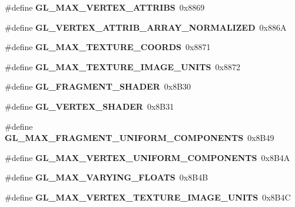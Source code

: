 \begin{DoxyCompactItemize}
\item 
\#define {\bfseries G\+L\+\_\+\+M\+A\+X\+\_\+\+V\+E\+R\+T\+E\+X\+\_\+\+A\+T\+T\+R\+I\+B\+S}~0x8869\label{_s_d_l__opengl_8h_a676ebaa9cbb5d801e916cc8f0c245f44}

\item 
\#define {\bfseries G\+L\+\_\+\+V\+E\+R\+T\+E\+X\+\_\+\+A\+T\+T\+R\+I\+B\+\_\+\+A\+R\+R\+A\+Y\+\_\+\+N\+O\+R\+M\+A\+L\+I\+Z\+E\+D}~0x886\+A\label{_s_d_l__opengl_8h_a27329f794ceb87696a167be875ce7fc8}

\item 
\#define {\bfseries G\+L\+\_\+\+M\+A\+X\+\_\+\+T\+E\+X\+T\+U\+R\+E\+\_\+\+C\+O\+O\+R\+D\+S}~0x8871\label{_s_d_l__opengl_8h_a947620859e913f928cd74a082ad9ed29}

\item 
\#define {\bfseries G\+L\+\_\+\+M\+A\+X\+\_\+\+T\+E\+X\+T\+U\+R\+E\+\_\+\+I\+M\+A\+G\+E\+\_\+\+U\+N\+I\+T\+S}~0x8872\label{_s_d_l__opengl_8h_aa1e280e2514abe7d70e7faea3566af6b}

\item 
\#define {\bfseries G\+L\+\_\+\+F\+R\+A\+G\+M\+E\+N\+T\+\_\+\+S\+H\+A\+D\+E\+R}~0x8\+B30\label{_s_d_l__opengl_8h_a1a0294662b50921555cae95fb20740d4}

\item 
\#define {\bfseries G\+L\+\_\+\+V\+E\+R\+T\+E\+X\+\_\+\+S\+H\+A\+D\+E\+R}~0x8\+B31\label{_s_d_l__opengl_8h_aceb29bc16e885f956eb9e351a7dd6276}

\item 
\#define {\bfseries G\+L\+\_\+\+M\+A\+X\+\_\+\+F\+R\+A\+G\+M\+E\+N\+T\+\_\+\+U\+N\+I\+F\+O\+R\+M\+\_\+\+C\+O\+M\+P\+O\+N\+E\+N\+T\+S}~0x8\+B49\label{_s_d_l__opengl_8h_a6ba6f2409d8bd8df147e09b0e3eb2820}

\item 
\#define {\bfseries G\+L\+\_\+\+M\+A\+X\+\_\+\+V\+E\+R\+T\+E\+X\+\_\+\+U\+N\+I\+F\+O\+R\+M\+\_\+\+C\+O\+M\+P\+O\+N\+E\+N\+T\+S}~0x8\+B4\+A\label{_s_d_l__opengl_8h_adf723a88758cec8f0d102e11d1a7cf09}

\item 
\#define {\bfseries G\+L\+\_\+\+M\+A\+X\+\_\+\+V\+A\+R\+Y\+I\+N\+G\+\_\+\+F\+L\+O\+A\+T\+S}~0x8\+B4\+B\label{_s_d_l__opengl_8h_af3bf01941a3298694c5b196bc0bdd514}

\item 
\#define {\bfseries G\+L\+\_\+\+M\+A\+X\+\_\+\+V\+E\+R\+T\+E\+X\+\_\+\+T\+E\+X\+T\+U\+R\+E\+\_\+\+I\+M\+A\+G\+E\+\_\+\+U\+N\+I\+T\+S}~0x8\+B4\+C\label{_s_d_l__opengl_8h_aa937c6648af59f9616f68dd4c7fdd787}


\end{DoxyCompactItemize}
